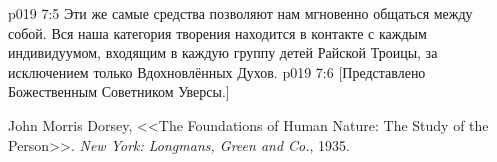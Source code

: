 \vs p019 7:5 Эти же самые средства позволяют нам мгновенно общаться между собой. Вся наша категория творения находится в контакте с каждым индивидуумом, входящим в каждую группу детей Райской Троицы, за исключением только Вдохновлённых Духов.
\vsetoff
\vs p019 7:6 [Представлено Божественным Советником Уверсы.]
\quizlink
\begin{thebibliography}{100}
John Morris Dorsey,
{<<The Foundations of Human Nature: The Study of the Person>>.}
{\em New York: Longmans, Green and Co.}, 1935.
\end{thebibliography}

